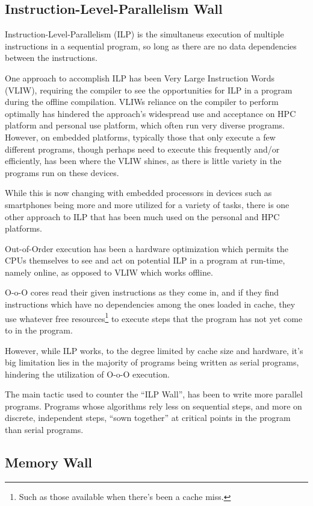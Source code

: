 \subsection{Instruction-Level-Parallelism Wall}

Instruction-Level-Parallelism (ILP) is the simultaneus execution of multiple instructions in a sequential program, so long as there are no data dependencies between the instructions.

One approach to accomplish ILP has been Very Large Instruction Words (VLIW), requiring the compiler to see the opportunities for ILP in a program during the offline compilation.
VLIWs reliance on the compiler to perform optimally has hindered the approach's widespread use and acceptance on HPC platform and personal use platform, which often run very diverse programs.
However, on embedded platforms, typically those that only execute a few different programs, though perhaps need to execute this frequently and/or efficiently, has been where the VLIW shines, as there is little variety in the programs run on these devices.

While this is now changing with embedded processors in devices such as smartphones being more and more utilized for a variety of tasks, there is one other approach to ILP that has been much used on the personal and HPC platforms.

Out-of-Order execution has been a hardware optimization which permits the CPUs themselves to see and act on potential ILP in a program at run-time, namely online, as opposed to VLIW which works offline.

O-o-O cores read their given instructions as they come in, and if they find instructions which have no dependencies among the ones loaded in cache, they use whatever free resources\footnote{Such as those available when there's been a cache miss.} to execute steps that the program has not yet come to in the program.

However, while ILP works, to the degree limited by cache size and hardware, it's big limitation lies in the majority of programs being written as serial programs, hindering the utilization of O-o-O execution.

The main tactic used to counter the ``ILP Wall'', has been to write more parallel programs.
Programs whose algorithms rely less on sequential steps, and more on discrete, independent steps, ``sown together'' at critical points in the program than serial programs.

\subsection{Memory Wall}

